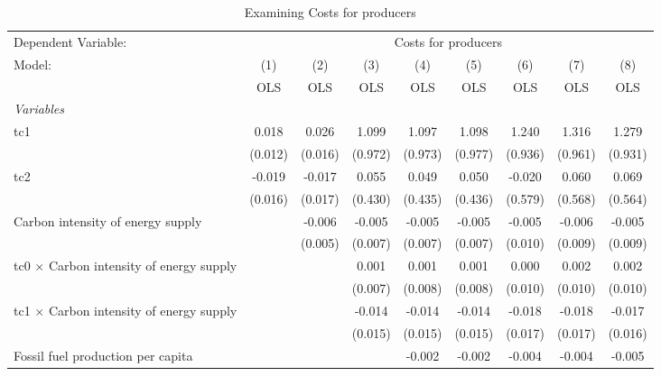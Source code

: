 
\begin{table}[htbp]
   \caption{Examining Costs for producers}
   \centering
   \begin{tabular}{lcccccccc}
      \toprule
      Dependent Variable: & \multicolumn{8}{c}{Costs for producers}\\
      Model:                                          & (1)     & (2)     & (3)     & (4)     & (5)     & (6)     & (7)     & (8)\\  
                                                      &  OLS    & OLS     & OLS     & OLS     & OLS     & OLS     & OLS     & OLS\\  
      \midrule
      \emph{Variables}\\
      tc1                                             & 0.018   & 0.026   & 1.099   & 1.097   & 1.098   & 1.240   & 1.316   & 1.279\\   
                                                      & (0.012) & (0.016) & (0.972) & (0.973) & (0.977) & (0.936) & (0.961) & (0.931)\\   
      tc2                                             & -0.019  & -0.017  & 0.055   & 0.049   & 0.050   & -0.020  & 0.060   & 0.069\\   
                                                      & (0.016) & (0.017) & (0.430) & (0.435) & (0.436) & (0.579) & (0.568) & (0.564)\\   
      Carbon intensity of energy supply               &         & -0.006  & -0.005  & -0.005  & -0.005  & -0.005  & -0.006  & -0.005\\   
                                                      &         & (0.005) & (0.007) & (0.007) & (0.007) & (0.010) & (0.009) & (0.009)\\   
      tc0 $\times$ Carbon intensity of energy supply  &         &         & 0.001   & 0.001   & 0.001   & 0.000   & 0.002   & 0.002\\   
                                                      &         &         & (0.007) & (0.008) & (0.008) & (0.010) & (0.010) & (0.010)\\   
      tc1 $\times$ Carbon intensity of energy supply  &         &         & -0.014  & -0.014  & -0.014  & -0.018  & -0.018  & -0.017\\   
                                                      &         &         & (0.015) & (0.015) & (0.015) & (0.017) & (0.017) & (0.016)\\   
      Fossil fuel production per capita               &         &         &         & -0.002  & -0.002  & -0.004  & -0.004  & -0.005\\   

\end{tabular}
\end{table}
